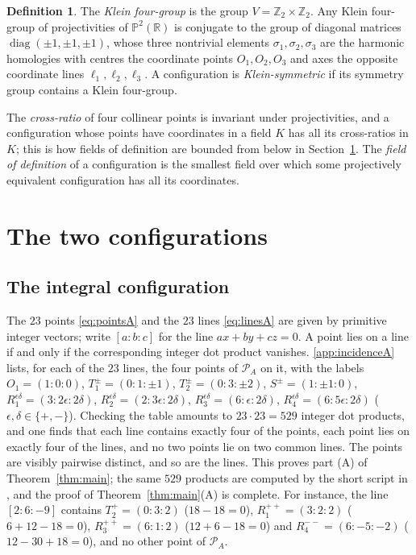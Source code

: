 \documentclass[11pt]{article}
\theoremstyle{plain}
\theoremstyle{definition}
\newtheorem*{definition}{Definition}
\newcommand{\RR}{\mathbb{R}}
\newcommand{\ZZ}{\mathbb{Z}}
\newcommand{\PP}{\mathbb{P}}
\newcommand{\cP}{\mathcal{P}}
\begin{document}
\begin{definition}
The \emph{Klein four-group} is the group $V=\ZZ_2\times\ZZ_2$.  Any Klein four-group of projectivities of $\PP^2(\RR)$ is conjugate to the group of diagonal matrices $\operatorname{diag}(\pm1,\pm1,\pm1)$, whose three nontrivial elements $\sigma_1,\sigma_2,\sigma_3$ are the harmonic homologies with centres the coordinate points $O_1,O_2,O_3$ and axes the opposite coordinate lines $\ell_1,\ell_2,\ell_3$.  A configuration is \emph{Klein-symmetric} if its symmetry group contains a Klein four-group.
\end{definition}

The \emph{cross-ratio} of four collinear points is invariant under projectivities, and a configuration whose points have coordinates in a field $K$ has all its cross-ratios in $K$; this is how fields of definition are bounded from below in Section~\ref{sec:config}.  The \emph{field of definition} of a configuration is the smallest field over which some projectively equivalent configuration has all its coordinates.

\section{The two configurations}\label{sec:config}

\subsection{The integral configuration}
The $23$ points \eqref{eq:pointsA} and the $23$ lines \eqref{eq:linesA} are given by primitive integer vectors; write $[a{:}b{:}c]$ for the line $ax+by+cz=0$.  A point lies on a line if and only if the corresponding integer dot product vanishes.  \ref{app:incidenceA} lists, for each of the $23$ lines, the four points of $\cP_A$ on it, with the labels $O_1=(1{:}0{:}0)$, $T_1^{\pm}=(0{:}1{:}{\pm}1)$, $T_2^{\pm}=(0{:}3{:}{\pm}2)$, $S^{\pm}=(1{:}{\pm}1{:}0)$, $R_1^{\epsilon\delta}=(3{:}2\epsilon{:}2\delta)$, $R_2^{\epsilon\delta}=(2{:}3\epsilon{:}2\delta)$, $R_3^{\epsilon\delta}=(6{:}\epsilon{:}2\delta)$, $R_4^{\epsilon\delta}=(6{:}5\epsilon{:}2\delta)$ ($\epsilon,\delta\in\{+,-\}$).  Checking the table amounts to $23\cdot23=529$ integer dot products, and one finds that each line contains exactly four of the points, each point lies on exactly four of the lines, and no two points lie on two common lines.  The points are visibly pairwise distinct, and so are the lines.  This proves part (A) of Theorem~\ref{thm:main}; the same $529$ products are computed by the short script in \cite{Lu26}, and the proof of Theorem~\ref{thm:main}(A) is complete.  For instance, the line $[2{:}6{:}-9]$ contains $T_2^{+}=(0{:}3{:}2)$ ($18-18=0$), $R_1^{++}=(3{:}2{:}2)$ ($6+12-18=0$), $R_3^{++}=(6{:}1{:}2)$ ($12+6-18=0$) and $R_4^{--}=(6{:}-5{:}-2)$ ($12-30+18=0$), and no other point of $\cP_A$.
\end{document}
